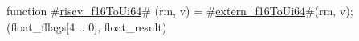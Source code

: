function #\hyperref[sailRISCVzriscvzyf16ToUi64]{riscv\_f16ToUi64}# (rm, v) = {
  #\hyperref[sailRISCVzexternzyf16ToUi64]{extern\_f16ToUi64}#(rm, v);
  (float_fflags[4 .. 0], float_result)
}
